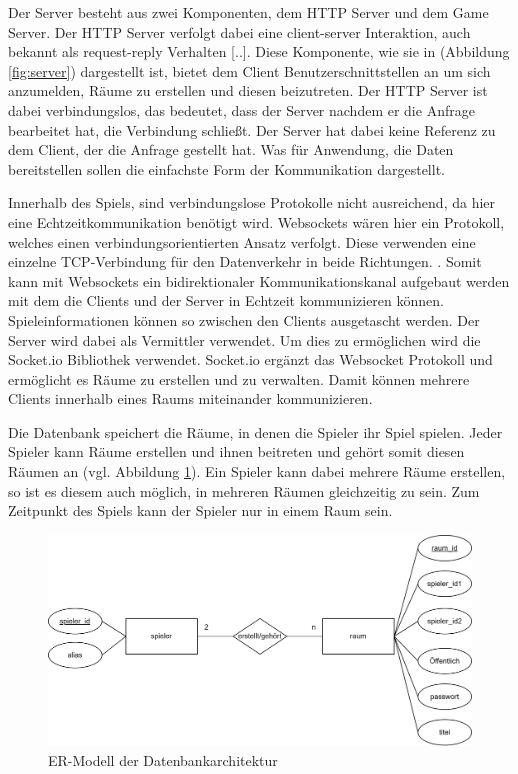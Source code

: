 \documentclass[
]{article}
\begin{document}
Der Server besteht aus zwei Komponenten, dem HTTP Server und dem Game Server.
Der HTTP Server verfolgt dabei eine \glqq  [..] client-server Interaktion, auch bekannt als 
request-reply Verhalten [..]\grqq{}\cite[S.37 ff.]{tanenbaum2007distributed}.
Diese Komponente, wie sie in (Abbildung \ref{fig:server}) dargestellt ist,
bietet dem Client Benutzerschnittstellen an um sich anzumelden, Räume zu erstellen und diesen beizutreten.
Der HTTP Server ist dabei verbindungslos, das bedeutet, 
dass der Server nachdem er die Anfrage bearbeitet hat, die Verbindung schließt.
Der Server hat dabei keine Referenz zu dem Client, der die Anfrage gestellt hat.
Was für Anwendung, die Daten bereitstellen sollen die einfachste Form der Kommunikation dargestellt.

Innerhalb des Spiels, sind verbindungslose Protokolle nicht ausreichend, da hier eine Echtzeitkommunikation benötigt wird.
Websockets wären hier ein Protokoll, welches einen verbindungsorientierten Ansatz verfolgt.
Diese \glqq [..] verwenden eine einzelne TCP-Verbindung für den Datenverkehr in beide Richtungen. 
\grqq{} \cite[Kapitel 1.1]{rfc-websocket}.
Somit kann mit Websockets ein bidirektionaler Kommunikationskanal aufgebaut werden mit dem die Clients 
und der Server in Echtzeit kommunizieren können.
Spieleinformationen können so zwischen den Clients ausgetascht werden. 
Der Server wird dabei als Vermittler verwendet. Um dies zu ermöglichen wird die Socket.io Bibliothek verwendet.
Socket.io ergänzt das Websocket Protokoll und ermöglicht es Räume zu erstellen und zu verwalten.
Damit können mehrere Clients innerhalb eines Raums miteinander kommunizieren.




Die Datenbank speichert die Räume, in denen die Spieler ihr Spiel spielen. 
Jeder Spieler kann Räume erstellen und ihnen beitreten und gehört somit diesen 
Räumen an (vgl. Abbildung \ref{fig:ER-Modell}).
Ein Spieler kann dabei mehrere Räume erstellen, so ist es diesem auch möglich, in mehreren Räumen gleichzeitig zu sein.
Zum Zeitpunkt des Spiels kann der Spieler nur in einem Raum sein.

\begin{figure}[H]
	\centering
	\includegraphics[width=\textwidth ]{resources/ER-Modell.png}
	\caption{ER-Modell der Datenbankarchitektur}
	\label{fig:ER-Modell}
\end{figure}
\end{document}
